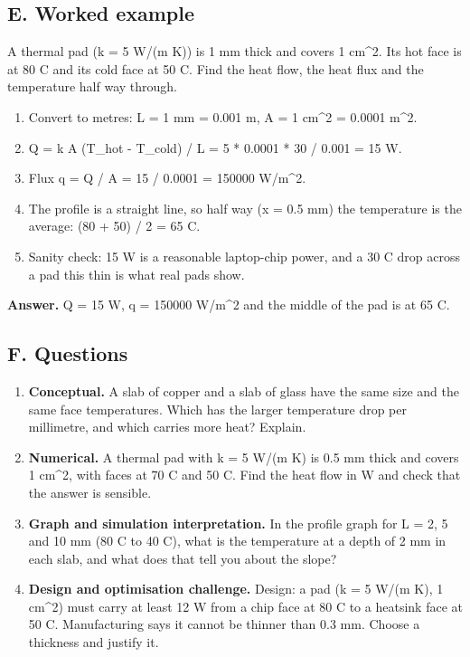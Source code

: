 \documentclass[11pt,a4paper]{article}
\begin{document}
\subsection*{E. Worked example}
A thermal pad (k = 5 W/(m K)) is 1 mm thick and covers 1 cm\textasciicircum{}2. Its hot face is at 80 C and its cold face at 50 C. Find the heat flow, the heat flux and the temperature half way through.
\begin{enumerate}[nosep]
\item Convert to metres: L = 1 mm = 0.001 m, A = 1 cm\textasciicircum{}2 = 0.0001 m\textasciicircum{}2.
\item Q = k A (T\_hot - T\_cold) / L = 5 * 0.0001 * 30 / 0.001 = 15 W.
\item Flux q = Q / A = 15 / 0.0001 = 150000 W/m\textasciicircum{}2.
\item The profile is a straight line, so half way (x = 0.5 mm) the temperature is the average: (80 + 50) / 2 = 65 C.
\item Sanity check: 15 W is a reasonable laptop-chip power, and a 30 C drop across a pad this thin is what real pads show.
\end{enumerate}
\textbf{Answer.} Q = 15 W, q = 150000 W/m\textasciicircum{}2 and the middle of the pad is at 65 C.

\subsection*{F. Questions}
\begin{enumerate}[nosep]
\item \textbf{Conceptual.} A slab of copper and a slab of glass have the same size and the same face temperatures. Which has the larger temperature drop per millimetre, and which carries more heat? Explain.
\item \textbf{Numerical.} A thermal pad with k = 5 W/(m K) is 0.5 mm thick and covers 1 cm\textasciicircum{}2, with faces at 70 C and 50 C. Find the heat flow in W and check that the answer is sensible.
\item \textbf{Graph and simulation interpretation.} In the profile graph for L = 2, 5 and 10 mm (80 C to 40 C), what is the temperature at a depth of 2 mm in each slab, and what does that tell you about the slope?
\item \textbf{Design and optimisation challenge.} Design: a pad (k = 5 W/(m K), 1 cm\textasciicircum{}2) must carry at least 12 W from a chip face at 80 C to a heatsink face at 50 C. Manufacturing says it cannot be thinner than 0.3 mm. Choose a thickness and justify it.
\end{enumerate}
\end{document}
